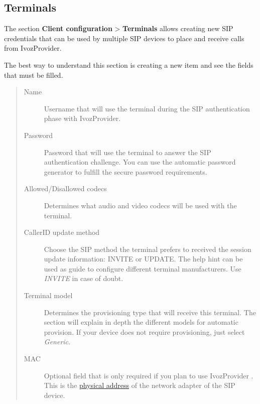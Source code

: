 \documentclass[letterpaper,10pt,spanish]{sphinxmanual}
\begin{document}
\subsection{Terminals}
\label{administration_portal/client/vpbx/terminals:terminals}\label{administration_portal/client/vpbx/terminals::doc}\label{administration_portal/client/vpbx/terminals:id1}
The section \textbf{Client configuration} \textgreater{} \textbf{Terminals} allows creating new
SIP credentials that can be used by multiple SIP devices to place and receive
calls from IvozProvider.

The best way to understand this section is creating a new item and see the
fields that must be filled.
\begin{quote}
\begin{description}
\item[{Name}] \leavevmode
Username that will use the terminal during the SIP authentication phase
with IvozProvider.

\item[{Password}] \leavevmode
Password that will use the terminal to answer the SIP authentication
challenge. You can use the automatic password generator to fulfill the
secure password requirements.

\item[{Allowed/Disallowed codecs}] \leavevmode
Determines what audio and video codecs will be used with the terminal.

\item[{CallerID update method}] \leavevmode
Choose the SIP method the terminal prefers to received the session
update information: INVITE or UPDATE. The help hint can be used as
guide to configure different terminal manufacturers. Use \emph{INVITE} in
case of doubt.

\item[{Terminal model}] \leavevmode
Determines the provisioning type that will receive this terminal.
The section {\hyperref[administration_portal/platform/terminal_manufacturers:provisioning]{}} will explain
in depth the different models for automatic provision. If your device
does not require provisioning, just select \emph{Generic}.

\item[{MAC}] \leavevmode
Optional field that is only required if you plan to use IvozProvider
{\hyperref[administration_portal/platform/terminal_manufacturers:provisioning]{}}. This is the \href{https://wikipedia.org/wiki/MAC\_Address}{physical
address} of the network
adapter of the SIP device.


\end{description}
\end{quote}
\end{document}
